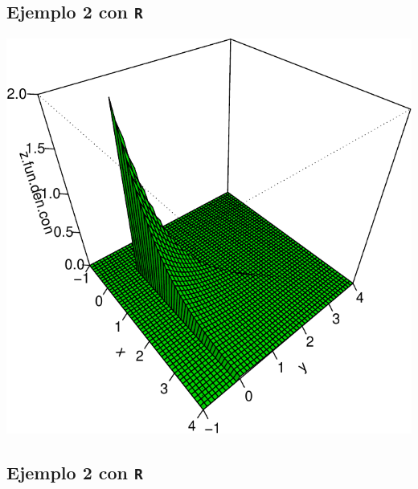\documentclass[]{book}
\begin{document}
\hypertarget{ejemplo-2-con-r-1}{%
\subsection{\texorpdfstring{Ejemplo 2 con \texttt{R}}{Ejemplo 2 con R}}\label{ejemplo-2-con-r-1}}

\begin{center}\includegraphics{curso-probabilidad-udemy_files/figure-latex/unnamed-chunk-136-1} \end{center}

\hypertarget{ejemplo-2-con-r-2}{%
\subsection{\texorpdfstring{Ejemplo 2 con \texttt{R}}{Ejemplo 2 con R}}\label{ejemplo-2-con-r-2}}
\end{document}
